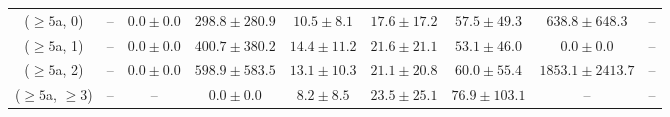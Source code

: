 \begin{table}[h!]
{\begin{tabular}{ccccccccc}
	($\ge5$a, 0) & -- & $0.0\pm 0.0$ & $298.8\pm 280.9$ & $10.5\pm 8.1$ & $17.6\pm 17.2$ & $57.5\pm 49.3$ & $638.8\pm 648.3$ & -- \\[0.5ex] 
	($\ge5$a, 1) & -- & $0.0\pm 0.0$ & $400.7\pm 380.2$ & $14.4\pm 11.2$ & $21.6\pm 21.1$ & $53.1\pm 46.0$ & $0.0\pm 0.0$ & -- \\[0.5ex] 
	($\ge5$a, 2) & -- & $0.0\pm 0.0$ & $598.9\pm 583.5$ & $13.1\pm 10.3$ & $21.1\pm 20.8$ & $60.0\pm 55.4$ & $1853.1\pm 2413.7$ & -- \\[0.5ex] 
	($\ge5$a, $\ge3$) & -- & -- & $0.0\pm 0.0$ & $8.2\pm 8.5$ & $23.5\pm 25.1$ & $76.9\pm 103.1$ & -- & -- \\[0.5ex] 
	\hline
	\hline
\end{tabular}}
\end{table}
